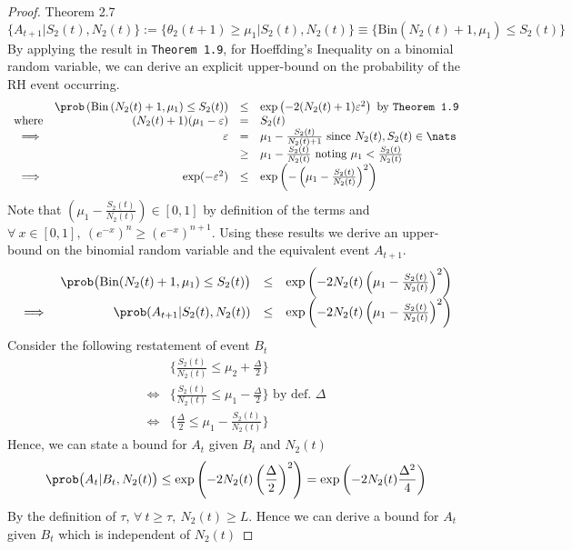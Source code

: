 \documentclass[11pt,a4paper]{article}
\begin{document}
\begin{proof}{Theorem 2.7}
  \[ \big\{A_{t+1}\big|S_2(t),N_2(t)\big\}:= \big\{\theta_2(t+1)\geq\mu_1\big|S_2(t),N_2(t)\big\}\equiv\big\{\text{Bin}(N_2(t)+1,\mu_1)\leq S_2(t)\big\} \]
  By applying the result in \texttt{Theorem 1.9}, for Hoeffding's Inequality on a binomial random variable, we can derive an explicit upper-bound on the probability of the RH event occurring.
  \[\begin{array}{rrcl}
    &\prob\left(\text{Bin}\left(N_2(t)+1,\mu_1\right)\leq S_2(t)\right)&\leq& \exp\left(-2(N_2(t)+1)\varepsilon^2\right)\text{ by \texttt{Theorem 1.9}}\\
    \text{where}&(N_2(t)+1)(\mu_1-\varepsilon)&=&S_2(t)\\
    \implies&\varepsilon&=&\mu_1-\frac{S_2(t)}{N_2(t)+1}\text{ since }N_2(t),S_2(t)\in\nats\\
    &&\geq&\mu_1-\frac{S_2(t)}{N_2(t)}\text{ noting }\mu_1<\frac{S_2(t)}{N_2(t)}\\
    \implies&\exp(-\varepsilon^2)&\leq&\exp\left(-\left(\mu_1-\frac{S_2(t)}{N_2(t)}\right)^2\right)
  \end{array}\]
  Note that $\textstyle\left(\mu_1-\frac{S_2(t)}{N_2(t)}\right)\in[0,1]$ by definition of the terms and ${\forall\ x\in[0,1],\ \left(e^{-x}\right)^n\geq\left(e^{-x}\right)^{n+1}}$. Using these results we derive an upper-bound on the binomial random variable and the equivalent event $A_{t+1}$.
  \[\begin{array}{rrcl}
    &\prob\big(\text{Bin}(N_2(t)+1,\mu_1)\leq S_2(t)\big)&\leq&\exp\left(-2N_2(t)\left(\mu_1-\frac{S_2(t)}{N_2(t)}\right)^2\right)\\
    \implies&\prob(A_{t+1}|S_2(t),N_2(t))&\leq&\exp\left(-2N_2(t)\left(\mu_1-\frac{S_2(t)}{N_2(t)}\right)^2\right)\\
  \end{array}\]
  Consider the following restatement of event $B_t$
  \[\begin{array}{rl}
    &\bigg\{\frac{S_2(t)}{N_2(t)}\leq\mu_2+\frac\Delta2\bigg\}\\
    \Longleftrightarrow&\bigg\{\frac{S_2(t)}{N_2(t)}\leq\mu_1-\frac\Delta2\bigg\}\text{ by def. }\Delta\\
    \Longleftrightarrow&\bigg\{\frac\Delta2\leq\mu_1-\frac{S_2(t)}{N_2(t)}\bigg\}
  \end{array}\]
  Hence, we can state a bound for $A_t$ given $B_t$ and $N_2(t)$
  \[ \prob\big(A_t|B_t,N_2(t)\big)\leq\exp\left(-2N_2(t)\left(\dfrac\Delta2\right)^2\right)=\exp\left(-2N_2(t)\dfrac{\Delta^2}4\right) \]
  By the definition of $\tau$, $\forall\ t\geq\tau,\ N_2(t)\geq L$. Hence we can derive a bound for $A_t$ given $B_t$ which is independent of $N_2(t)$

\end{proof}
\end{document}
